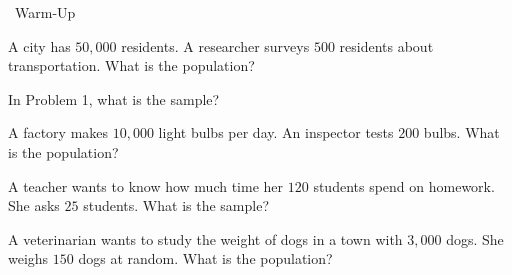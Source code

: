 \begin{practiceBox}[funGreen]{\faSun~Warm-Up}


\prob A city has $50{,}000$ residents. A researcher surveys $500$ residents about transportation. What is the population? \answerBlank[4cm]

\prob In Problem 1, what is the sample? \answerBlank[4cm]

\prob A factory makes $10{,}000$ light bulbs per day. An inspector tests $200$ bulbs. What is the population? \answerBlank[4cm]

\prob A teacher wants to know how much time her $120$ students spend on homework. She asks $25$ students. What is the sample? \answerBlank[4cm]

\prob A veterinarian wants to study the weight of dogs in a town with $3{,}000$ dogs. She weighs $150$ dogs at random. What is the population? \answerBlank[4cm]

\end{practiceBox}

